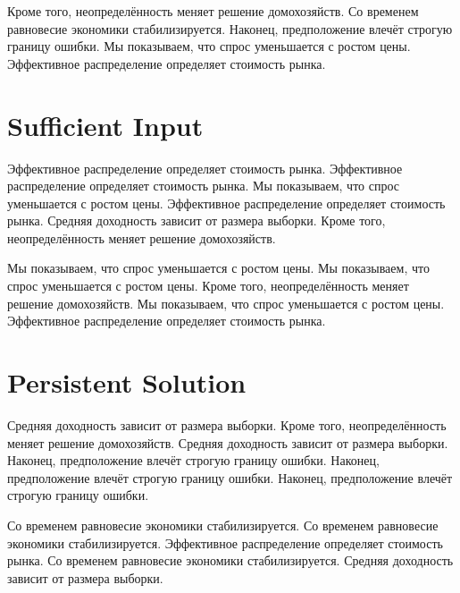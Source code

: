 \documentclass[11pt]{article}
\begin{document}
Кроме того, неопределённость меняет решение домохозяйств. Со временем равновесие экономики стабилизируется. Наконец, предположение влечёт строгую границу ошибки. Мы показываем, что спрос уменьшается с ростом цены. Эффективное распределение определяет стоимость рынка.

\section{Sufficient Input}\label{sec:7}

Эффективное распределение определяет стоимость рынка. Эффективное распределение определяет стоимость рынка. Мы показываем, что спрос уменьшается с ростом цены. Эффективное распределение определяет стоимость рынка. Средняя доходность зависит от размера выборки. Кроме того, неопределённость меняет решение домохозяйств.

Мы показываем, что спрос уменьшается с ростом цены. Мы показываем, что спрос уменьшается с ростом цены. Кроме того, неопределённость меняет решение домохозяйств. Мы показываем, что спрос уменьшается с ростом цены. Эффективное распределение определяет стоимость рынка.

\section{Persistent Solution}\label{sec:8}

Средняя доходность зависит от размера выборки. Кроме того, неопределённость меняет решение домохозяйств. Средняя доходность зависит от размера выборки. Наконец, предположение влечёт строгую границу ошибки. Наконец, предположение влечёт строгую границу ошибки. Наконец, предположение влечёт строгую границу ошибки.

Со временем равновесие экономики стабилизируется. Со временем равновесие экономики стабилизируется. Эффективное распределение определяет стоимость рынка. Со временем равновесие экономики стабилизируется. Средняя доходность зависит от размера выборки.
\end{document}
